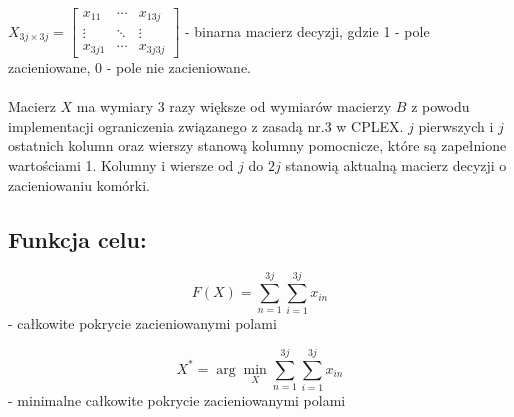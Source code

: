 \documentclass{article}
\begin{document}
$ X_{3j\times 3j} = 
\begin{bmatrix}
x_{1 1} & \cdots & x_{1 3j}\\
\vdots & \ddots & \vdots\\
x_{3j 1} & \cdots & x_{3j 3j}
\end{bmatrix}$
- binarna macierz decyzji, gdzie 1 - pole zacieniowane, 0 - pole nie zacieniowane. 
\\
\\
Macierz $X$ ma wymiary 3 razy większe od wymiarów macierzy $B$ z powodu implementacji ograniczenia związanego z zasadą nr.3 w CPLEX. $j$ pierwszych i $j$ ostatnich kolumn oraz wierszy stanową kolumny pomocnicze, które są zapełnione wartościami 1. Kolumny i wiersze od $j$ do $2j$ stanowią aktualną macierz decyzji o zacieniowaniu komórki.
\\
\subsection{Funkcja celu:}
\begin{equation}
F(X) = \sum_{n=1}^{3j}\sum_{i=1}^{3j} x_{in}
\end{equation} - całkowite pokrycie zacieniowanymi polami

\begin{equation}
X^* = \arg \min_{X} \sum_{n=1}^{3j}\sum_{i=1}^{3j} x_{in}
\end{equation} - minimalne całkowite pokrycie zacieniowanymi polami \\
\end{document}

